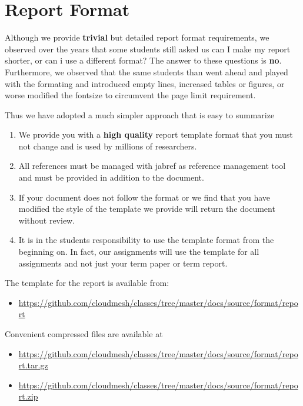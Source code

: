 \FILENAME

\section{Report Format}\label{report-format}

Although we provide \textbf{trivial} but detailed report format
requirements, we observed over the years that some students still asked
us can I make my report shorter, or can i use a different format? The
answer to these questions is \textbf{no}. Furthermore, we observed that
the same students than went ahead and played with the formating and
introduced empty lines, increased tables or figures, or worse modified
the fontsize to circumvent the page limit requirement.

Thus we have adopted a much simpler approach that is easy to summarize

\begin{enumerate}
\def\labelenumi{\arabic{enumi}.}
\tightlist
\item
  We provide you with a \textbf{high quality} report template format
  that you must not change and is used by millions of researchers.
\item
  All references must be managed with jabref as reference management
  tool and must be provided in addition to the document.
\item
  If your document does not follow the format or we find that you have
  modified the style of the template we provide will return the document
  without review.
\item
  It is in the students responsibility to use the template format from
  the beginning on. In fact, our assignments will use the template for
  all assignments and not just your term paper or term report.
\end{enumerate}

The template for the report is available from:

\begin{itemize}
\tightlist
\item
  \url{https://github.com/cloudmesh/classes/tree/master/docs/source/format/report}
\end{itemize}

Convenient compressed files are available at

\begin{itemize}
\tightlist
\item
  \url{https://github.com/cloudmesh/classes/tree/master/docs/source/format/report.tar.gz}
\item
  \url{https://github.com/cloudmesh/classes/tree/master/docs/source/format/report.zip}
\end{itemize}

